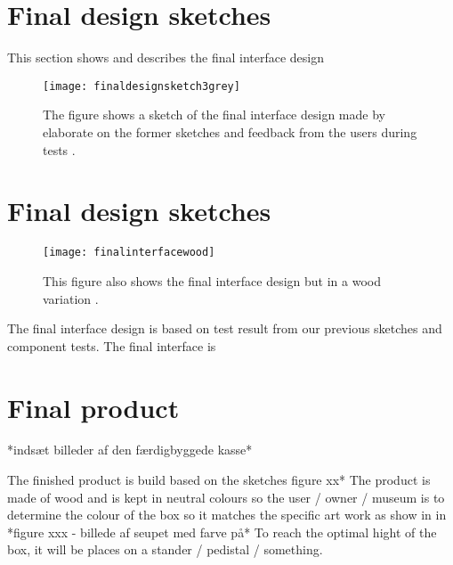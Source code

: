 \section{Final design sketches}
This section shows and describes the final interface design

\begin{figure}[!h] 
\centering
\texttt{[image: finaldesignsketch3grey]}
\caption{\label{fig:inaldesignsketch3grey} The figure shows a sketch of the final interface design made by elaborate on the former sketches and feedback from the users during tests .}
\end{figure}

\section{Final design sketches}
\begin{figure}[!h] 
\centering
\texttt{[image: finalinterfacewood]}
\caption{\label{fig:finalinterfacewood} This figure also shows the final interface design but in a wood variation .}
\end{figure}
 
 
 The final interface design is based on test result from our previous sketches and component tests. The final interface is 
 
 
 
 \section{Final product }
*indsæt billeder af den færdigbyggede kasse* 

The finished product is build based on the sketches figure xx* The product is made of wood and is kept in neutral colours so the user / owner / museum is to determine the colour of the box so it matches the specific art work as show in in *figure xxx - billede af seupet med farve på* To reach the optimal hight of the box, it will be places on a stander / pedistal / something. 









